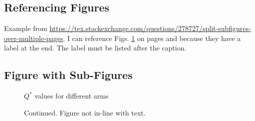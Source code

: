 \subsection{Referencing Figures}

Example from \href{link}{https://tex.stackexchange.com/questions/278727/split-subfigures-over-multiple-pages}. I can reference Figs. \ref{fig:sample-sub-figs} on pages \pageref{fig:sample-sub-figs} and \pageref{fig:sample-sub-fig-continued} because they have a label at the end. The label must be listed after the caption.

\subsection{Figure with Sub-Figures}

\begin{figure}[H]
    \centering


    \caption{$Q^{*}$ values for different arms}
    \label{fig:sample-sub-figs}
\end{figure}

\begin{figure}[H]\ContinuedFloat
    \centering
  
   
    \caption{Continued. Figure not in-line with text.}
    \label{fig:sample-sub-fig-continued}
\end{figure}